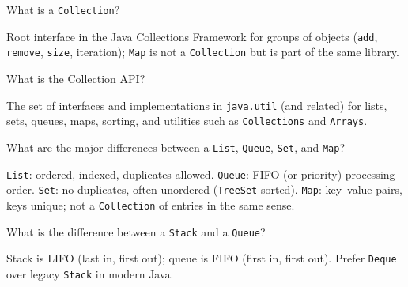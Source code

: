 



\question[4]
What is a \texttt{Collection}?
\begin{solutionorbox}[1.15in]
  Root interface in the Java Collections Framework for groups of objects (\texttt{add}, \texttt{remove}, \texttt{size}, iteration); \texttt{Map} is not a \texttt{Collection} but is part of the same library.
\end{solutionorbox}

\question[4]
What is the Collection API?
\begin{solutionorbox}[1.2in]
  The set of interfaces and implementations in \texttt{java.util} (and related) for lists, sets, queues, maps, sorting, and utilities such as \texttt{Collections} and \texttt{Arrays}.
\end{solutionorbox}

\question[4]
What are the major differences between a \texttt{List}, \texttt{Queue}, \texttt{Set}, and \texttt{Map}?
\begin{solutionorbox}[1.65in]
  \texttt{List}: ordered, indexed, duplicates allowed. \texttt{Queue}: FIFO (or priority) processing order. \texttt{Set}: no duplicates, often unordered (\texttt{TreeSet} sorted). \texttt{Map}: key--value pairs, keys unique; not a \texttt{Collection} of entries in the same sense.
\end{solutionorbox}

\question[4]
What is the difference between a \texttt{Stack} and a \texttt{Queue}?
\begin{solutionorbox}[1.2in]
  Stack is LIFO (last in, first out); queue is FIFO (first in, first out). Prefer \texttt{Deque} over legacy \texttt{Stack} in modern Java.
\end{solutionorbox}

\newpage


